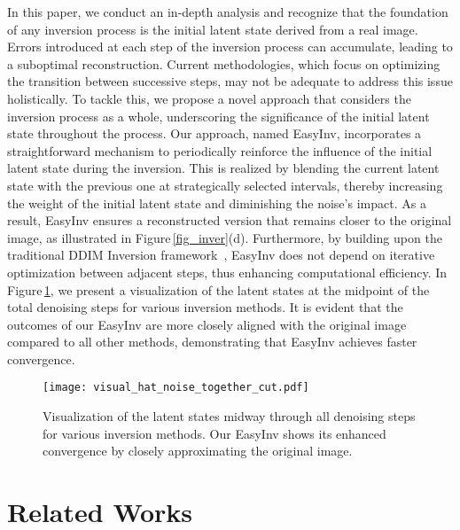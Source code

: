 \documentclass[letterpaper]{article} \usepackage{aaai25}  \usepackage{times}  \usepackage{helvet}  \usepackage{courier}  \usepackage[hyphens]{url}  \usepackage{graphicx} \urlstyle{rm} \def\UrlFont{\rm}  \usepackage{natbib}  \usepackage{caption} \frenchspacing  \setlength{\pdfpagewidth}{8.5in} \setlength{\pdfpageheight}{11in} \usepackage{algorithm}
\begin{document}
In this paper, we conduct an in-depth analysis and recognize that the foundation of any inversion process is the initial latent state derived from a real image. Errors introduced at each step of the inversion process can accumulate, leading to a suboptimal reconstruction. Current methodologies, which focus on optimizing the transition between successive steps, may not be adequate to address this issue holistically. To tackle this, we propose a novel approach that considers the inversion process as a whole, underscoring the significance of the initial latent state throughout the process. Our approach, named EasyInv, incorporates a straightforward mechanism to periodically reinforce the influence of the initial latent state during the inversion. This is realized by blending the current latent state with the previous one at strategically selected intervals, thereby increasing the weight of the initial latent state and diminishing the noise's impact. As a result, EasyInv ensures a reconstructed version that remains closer to the original image, as illustrated in Figure\,\ref{fig_inver}(d). Furthermore, by building upon the traditional DDIM Inversion framework~\cite{couairon2023diffedit}, EasyInv does not depend on iterative optimization between adjacent steps, thus enhancing computational efficiency. In Figure\,\ref{fig_mid_step}, we present a visualization of the latent states at the midpoint of the total denoising steps for various inversion methods. It is evident that the outcomes of our EasyInv are more closely aligned with the original image compared to all other methods, demonstrating that EasyInv achieves faster convergence.




\begin{figure}[!t]
  \centering
  \texttt{[image: visual\_hat\_noise\_together\_cut.pdf]}
  \caption{Visualization of the latent states midway through all denoising steps for various inversion methods. Our EasyInv shows its enhanced convergence by closely approximating the original image.}
  \label{fig_mid_step}
\end{figure}

\section{Related Works}
\label{Re_works}
\end{document}
